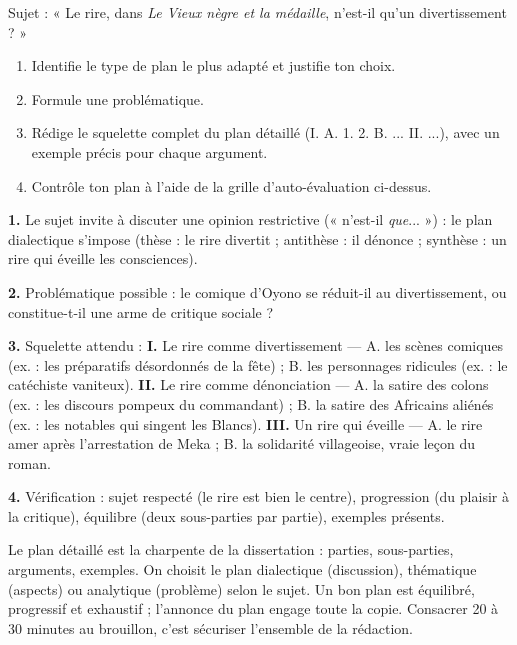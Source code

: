 \documentclass[11pt]{article}
\newcommand{\cle}[1]{{\popxbold\color{popdark}#1}}
\begin{document}
\begin{exercice}
Sujet : « Le rire, dans \emph{Le Vieux nègre et la médaille}, n'est-il qu'un divertissement ? »
\begin{enumerate}
\item Identifie le type de plan le plus adapté et justifie ton choix.
\item Formule une problématique.
\item Rédige le squelette complet du plan détaillé (I. A. 1. 2. B. ... II. ...), avec un exemple précis pour chaque argument.
\item Contrôle ton plan à l'aide de la grille d'auto-évaluation ci-dessus.
\end{enumerate}
\end{exercice}

\begin{corrige}[Exercice 1]
\textbf{1.} Le sujet invite à discuter une opinion restrictive (« n'est-il \emph{que}... ») : le \cle{plan dialectique} s'impose (thèse : le rire divertit ; antithèse : il dénonce ; synthèse : un rire qui éveille les consciences).

\textbf{2.} Problématique possible : le comique d'Oyono se réduit-il au divertissement, ou constitue-t-il une arme de critique sociale ?

\textbf{3.} Squelette attendu :
\textbf{I.} Le rire comme divertissement — A. les scènes comiques (ex. : les préparatifs désordonnés de la fête) ; B. les personnages ridicules (ex. : le catéchiste vaniteux).
\textbf{II.} Le rire comme dénonciation — A. la satire des colons (ex. : les discours pompeux du commandant) ; B. la satire des Africains aliénés (ex. : les notables qui singent les Blancs).
\textbf{III.} Un rire qui éveille — A. le rire amer après l'arrestation de Meka ; B. la solidarité villageoise, vraie leçon du roman.

\textbf{4.} Vérification : sujet respecté (le rire est bien le centre), progression (du plaisir à la critique), équilibre (deux sous-parties par partie), exemples présents.
\end{corrige}

\begin{aretenir}[L'essentiel]
Le plan détaillé est la charpente de la dissertation : parties, sous-parties, arguments, exemples. On choisit le plan \cle{dialectique} (discussion), \cle{thématique} (aspects) ou \cle{analytique} (problème) selon le sujet. Un bon plan est équilibré, progressif et exhaustif ; l'annonce du plan engage toute la copie. Consacrer 20 à 30 minutes au brouillon, c'est sécuriser l'ensemble de la rédaction.
\end{aretenir}
\end{document}
